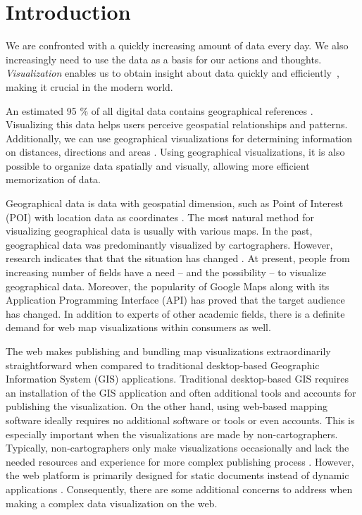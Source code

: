 
\chapter{Introduction}
\label{chapter:intro}


We are confronted with a quickly increasing amount of data every day. We also increasingly need to use the data as a basis for our actions and thoughts. \emph{Visualization} enables us to obtain insight about data quickly and efficiently~\citep{van_wijk_value_2005}, making it crucial in the modern world. 

An estimated 95 \% of all digital data contains geographical references \citep{perkins_have_2010}. Visualizing this data helps users perceive geospatial relationships and patterns. Additionally, we can use geographical visualizations for determining information on distances, directions and areas \citep[chap.~1.1]{kraak_cartography_2011}. Using geographical visualizations, it is also possible to organize data spatially and visually, allowing more efficient memorization of data.

Geographical data is data with geospatial dimension, such as Point of Interest (POI) with location data as coordinates \citep[chap.~1.2]{kraak_cartography_2011}. The most natural method for visualizing geographical data is usually with various maps. In the past, geographical data was predominantly visualized by cartographers. However, research indicates that that the situation has changed \citep{kraak_visualization_1999}. At present, people from increasing number of fields have a need -- and the possibility \citep[chap.~1]{slocum_thematic_2014} -- to visualize geographical data. Moreover, the popularity of Google Maps \citep{google_maps_2005-1} along with its Application Programming Interface (API) \citep{google_maps_2005} has proved that the target audience has changed. In addition to experts of other academic fields, there is a definite demand for web map visualizations within consumers as well. 

The web makes publishing and bundling map visualizations extraordinarily straightforward when compared to traditional desktop-based Geographic Information System (GIS) applications. Traditional desktop-based GIS requires an installation of the GIS application and often additional tools and accounts for publishing the visualization. On the other hand, using web-based mapping software ideally requires no additional software or tools or even accounts. This is especially important when the visualizations are made by non-cartographers. Typically, non-cartographers only make visualizations occasionally and lack the needed resources and experience for more complex publishing process \citep{miller_beast_2006}. However, the web platform is primarily designed for static documents \citep{berners-lee_information_1989,berners-lee_world-wide_1992} instead of dynamic applications \citep{jazayeri_trends_2007}. Consequently, there are some additional concerns to address when making a complex data visualization on the web.

